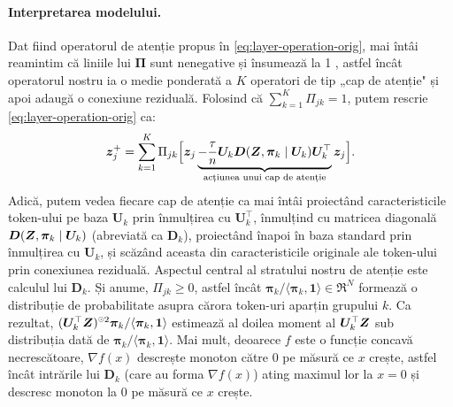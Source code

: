 \documentclass[../../book-main_ro.tex]{subfiles}
\begin{document}
\paragraph{Interpretarea modelului.} Dat fiind operatorul de atenție propus în \eqref{eq:layer-operation-orig}, mai întâi reamintim că liniile lui $\bm\Pi$ sunt nenegative și însumează la 1
, astfel încât operatorul nostru ia o medie ponderată a $K$ operatori de tip „cap de atenție" și apoi adaugă o conexiune reziduală. Folosind că \(\sum_{k = 1}^{K}\Pi_{jk} = 1\), putem rescrie \eqref{eq:layer-operation-orig} ca: %
\vspace{-2mm}
\begin{equation}
\label{eq:z_up}
    \bm{z}_j^+ = \sum_{k=1}^K \Pi_{jk} \Big[ \bm{z}_j \underbrace{- \frac{\tau}{n} \bm U_{k} \bm D(\bm{Z}, \bm \pi_{k} \mid \bm U_{k}) \bm U_{k}^{\top}}_{\text{acțiunea unui cap de atenție}} \bm{z}_j \Big].
\end{equation}
Adică, putem vedea fiecare cap de atenție ca mai întâi proiectând caracteristicile token-ului
pe baza $\bm U_{k}$ prin înmulțirea cu $\bm U_k^\top$, înmulțind cu
matricea diagonală $\bm D(\bm{Z}, \bm \pi_{k} \mid \bm U_{k})$ (abreviată ca \(\bm
D_{k}\)), proiectând înapoi în baza standard prin înmulțirea cu $\bm
U_{k}$, și scăzând aceasta din caracteristicile originale ale token-ului prin
conexiunea reziduală. Aspectul central al stratului nostru de atenție este calculul lui $\bm
D_{k}$. Și anume, \(\Pi_{jk} \geq 0\), astfel încât $\bm \pi_k / \langle \bm \pi_{k}, \bm
1\rangle \in \Re^N$ formează o distribuție de probabilitate asupra cărora token-uri aparțin
grupului $k$. Ca rezultat, $(\bm U^\top_k \Z)^{\hada 2} \bm \pi_k / \langle \bm \pi_{k}, \bm 1\rangle$ estimează al doilea moment al $\bm U_k^\top \bm{Z}$ sub distribuția dată de $\bm \pi_k / \langle \bm \pi_{k}, \bm 1\rangle$. Mai mult, deoarece $f$ este o funcție concavă necrescătoare, $\nabla f(x)$ descrește monoton către $0$ pe măsură ce $x$ crește, astfel încât intrările lui $\bm D_{k}$ (care au forma $\nabla f(x)$) ating maximul lor la $x=0$ %
și descresc monoton la $0$ pe măsură ce $x$ crește.
\end{document}
